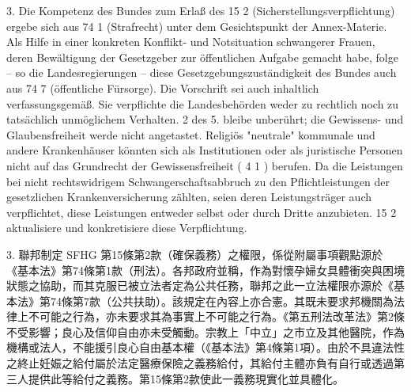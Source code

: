 \documentclass[12pt]{article}
\begin{document}
\begin{sourcepara}[title={原文C.28}]
3. Die Kompetenz des Bundes zum Erlaß des \abbrArt{} 15 \abbrNr{} 2 \abbrSFHG{} (Sicherstellungsverpflichtung) ergebe sich aus \abbrArt{} 74 \abbrNr{} 1 \abbrGG{}\ggfnArtSeventyFourOneDE{} (Strafrecht) unter dem Gesichtspunkt der Annex-Materie. Als Hilfe in einer konkreten Konflikt- und Notsituation schwangerer Frauen, deren Bewältigung der Gesetzgeber zur öffentlichen Aufgabe gemacht habe, folge -- so die Landesregierungen -- diese Gesetzgebungszuständigkeit des Bundes auch aus \abbrArt{} 74 \abbrNr{} 7 \abbrGG{}\ggfnArtSeventyFourSevenDE{} (öffentliche Fürsorge). Die Vorschrift sei auch inhaltlich verfassungsgemäß. Sie verpflichte die Landesbehörden weder zu rechtlich noch zu tatsächlich unmöglichem Verhalten. \abbrArt{} 2 des 5. \abbrStrRG{} bleibe unberührt; die Gewissens- und Glaubensfreiheit werde nicht angetastet. Religiös "neutrale" kommunale und andere Krankenhäuser könnten sich als Institutionen oder als juristische Personen nicht auf das Grundrecht der Gewissensfreiheit (\abbrArt{} 4 \abbrAbs{} 1 \abbrGG{}\ggfnArtFourOneDE{}) berufen. Da die Leistungen bei nicht rechtswidrigem Schwangerschaftsabbruch zu den Pflichtleistungen der gesetzlichen Krankenversicherung zählten, seien deren Leistungsträger auch verpflichtet, diese Leistungen entweder selbst oder durch Dritte anzubieten. \abbrArt{} 15 \abbrNr{} 2 aktualisiere und konkretisiere diese Verpflichtung.
\end{sourcepara}
\begin{transpara}
3. 聯邦制定 SFHG 第15條第2款（確保義務）之權限，係從附屬事項觀點源於《基本法》第74條第1款\ggfnArtSeventyFourOneZH{}（刑法）。各邦政府並稱，作為對懷孕婦女具體衝突與困境狀態之協助，而其克服已被立法者定為公共任務，聯邦之此一立法權限亦源於《基本法》第74條第7款\ggfnArtSeventyFourSevenZH{}（公共扶助）。該規定在內容上亦合憲。其既未要求邦機關為法律上不可能之行為，亦未要求其為事實上不可能之行為。《第五刑法改革法》第2條不受影響；良心及信仰自由亦未受觸動。宗教上「中立」之市立及其他醫院，作為機構或法人，不能援引良心自由基本權（《基本法》第4條第1項\ggfnArtFourOneZH{}）。由於不具違法性之終止妊娠之給付屬於法定醫療保險之義務給付，其給付主體亦負有自行或透過第三人提供此等給付之義務。第15條第2款使此一義務現實化並具體化。
\end{transpara}
\end{document}
